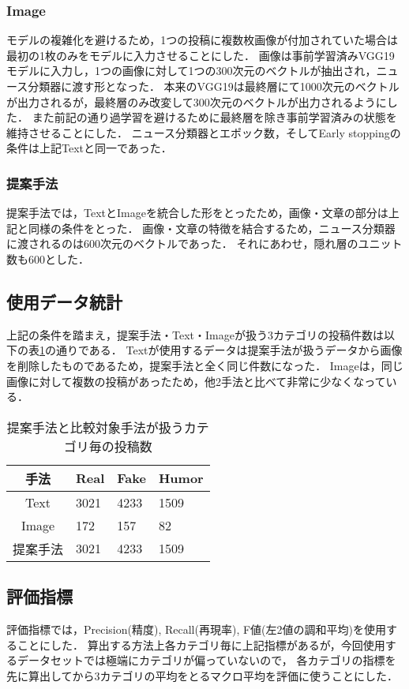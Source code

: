 \subsubsection{Image}
モデルの複雑化を避けるため，1つの投稿に複数枚画像が付加されていた場合は最初の1枚のみをモデルに入力させることにした．
画像は事前学習済みVGG19モデルに入力し，1つの画像に対して1つの300次元のベクトルが抽出され，ニュース分類器に渡す形となった．
本来のVGG19は最終層にて1000次元のベクトルが出力されるが，最終層のみ改変して300次元のベクトルが出力されるようにした．
また前記の通り過学習を避けるために最終層を除き事前学習済みの状態を維持させることにした．
ニュース分類器とエポック数，そしてEarly stoppingの条件は上記Textと同一であった．
%
\subsubsection{提案手法}
提案手法では，TextとImageを統合した形をとったため，画像・文章の部分は上記と同様の条件をとった．
画像・文章の特徴を結合するため，ニュース分類器に渡されるのは600次元のベクトルであった．
それにあわせ，隠れ層のユニット数も600とした．
%
\subsection{使用データ統計}
上記の条件を踏まえ，提案手法・Text・Imageが扱う3カテゴリの投稿件数は以下の表\ref{table:posts}の通りである．
Textが使用するデータは提案手法が扱うデータから画像を削除したものであるため，提案手法と全く同じ件数になった．
Imageは，同じ画像に対して複数の投稿があったため，他2手法と比べて非常に少なくなっている．

\begin{table}[ht]
    \caption{提案手法と比較対象手法が扱うカテゴリ毎の投稿数}
    \label{table:posts}
    \centering
    \begin{tabular}{clll}
        \hline
        手法 & Real & Fake & Humor \\
        \hline \hline
        Text & 3021 & 4233 & 1509 \\
        Image & 172 & 157 & 82 \\
        提案手法 & 3021 & 4233 & 1509 \\
        \hline
    \end{tabular}
\end{table}

\subsection{評価指標}
評価指標では，Precision(精度), Recall(再現率), F値(左2値の調和平均)を使用することにした．
算出する方法上各カテゴリ毎に上記指標があるが，今回使用するデータセットでは極端にカテゴリが偏っていないので，
各カテゴリの指標を先に算出してから3カテゴリの平均をとるマクロ平均を評価に使うことにした．

